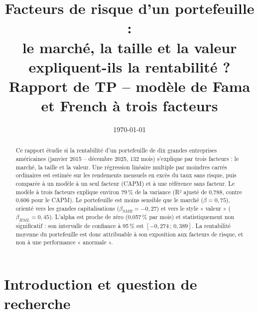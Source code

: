 \documentclass[11pt,a4paper]{article}
\title{\textbf{Facteurs de risque d'un portefeuille :\\le marché, la taille et la valeur expliquent-ils la rentabilité ?}\\[0.4em]\large Rapport de TP -- modèle de Fama et French à trois facteurs}
\author{}
\date{\today}
\begin{document}
\maketitle

\begin{abstract}
\noindent Ce rapport étudie si la rentabilité d'un portefeuille de dix grandes entreprises américaines (janvier 2015 -- décembre 2025, 132 mois) s'explique par trois facteurs : le marché, la taille et la valeur. Une régression linéaire multiple par moindres carrés ordinaires est estimée sur les rendements mensuels en excès du taux sans risque, puis comparée à un modèle à un seul facteur (CAPM) et à une référence sans facteur. Le modèle à trois facteurs explique environ 79\,\% de la variance (R² ajusté de 0,788, contre 0,606 pour le CAPM). Le portefeuille est moins sensible que le marché ($\beta = 0{,}75$), orienté vers les grandes capitalisations ($\beta_{SMB} = -0{,}27$) et vers le style « valeur » ($\beta_{HML} = 0{,}45$). L'alpha est proche de zéro (0,057\,\% par mois) et statistiquement non significatif : son intervalle de confiance à 95\,\% est $[-0{,}274\,;\,0{,}389]$. La rentabilité moyenne du portefeuille est donc attribuable à son exposition aux facteurs de risque, et non à une performance « anormale ».
\end{abstract}

\tableofcontents
\newpage

\section{Introduction et question de recherche}
\end{document}
